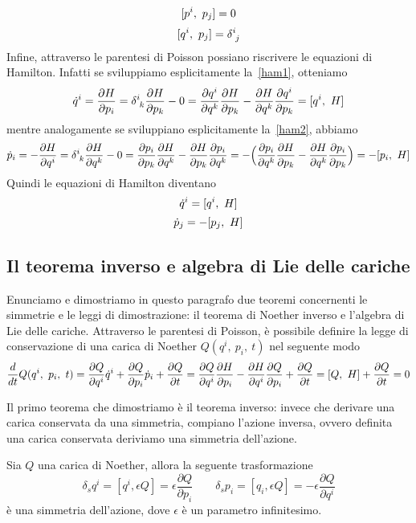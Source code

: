     \begin{equation} \label{canp}
        [p^i, ~p_j] = 0
    \end{equation}
    \begin{equation} \label{canqq}
        \poi{q^i}{p_j} = \delta^i_{\phantom i j}
    \end{equation}
    Infine, attraverso le parentesi di Poisson possiano riscrivere le equazioni di Hamilton. Infatti se sviluppiamo esplicitamente la~\eqref{ham1}, otteniamo 
    \begin{equation*}
        \dot q^i = \pdv{H}{p_i} = \delta^i_{\phantom i k} \pdv{H}{p_k} - 0 = \pdv{q^i}{q^k} \pdv{H}{p_k} - \pdv{H}{q^k} \pdv{q^i}{p_k} = \poi{q^i}{H}
    \end{equation*}
    mentre analogamente se sviluppiano esplicitamente la~\eqref{ham2}, abbiamo
    \begin{equation*}
        \dot p_i = - \pdv{H}{q^i} = \delta^i_{\phantom i k} \pdv{H}{q^k} - 0 = \pdv{p_i}{p_k} \pdv{H}{q^k} - \pdv{H}{p_k} \pdv{p_i}{q^k} = - \Big( \pdv{p_i}{q^k} \pdv{H}{p_k} - \pdv{H}{q^k} \pdv{p_i}{p_k} \Big) = - \poi{p_i}{H}
    \end{equation*}
    Quindi le equazioni di Hamilton diventano 
    \begin{equation} \label{poiham1}
        \dot q^i = [q^i, ~H]
    \end{equation}
    \begin{equation} \label{poiham2}
        \dot p_j = - [p_j, ~H]
    \end{equation}  

\subsection{Il teorema inverso e algebra di Lie delle cariche}

    Enunciamo e dimostriamo in questo paragrafo due teoremi concernenti le simmetrie e le leggi di dimostrazione: il teorema di Noether inverso e l'algebra di Lie delle cariche. Attraverso le parentesi di Poisson, è possibile definire la legge di conservazione di una carica di Noether $ Q(q^i, ~p_i, ~t)$ nel seguente modo
    \begin{equation} \label{caricaham}
        \frac{d}{dt} Q(q^i, ~p_i, ~t) = \frac{\partial Q}{\partial q^i} \dot q^i + \frac{\partial Q}{\partial p_i} \dot p_i + \frac{\partial Q}{\partial t} = \frac{\partial Q}{\partial q^i} \frac{\partial H}{\partial p_i} - \frac{\partial H}{\partial q^i} \frac{\partial Q}{\partial p_i} + \frac{\partial Q}{\partial t} = [Q, ~H] + \frac{\partial Q}{\partial t} = 0
    \end{equation}

    Il primo teorema che dimostriamo è il teorema inverso: invece che derivare una carica conservata da una simmetria, compiano l'azione inversa, ovvero definita una carica conservata deriviamo una simmetria dell'azione.
    \begin{theorem}
        Sia $Q$ una carica di Noether, allora la seguente trasformazione 
    \begin{equation*}
        \delta_s q^i = [q^i, \epsilon Q] = \epsilon \frac{\partial Q}{\partial p_i} \qquad \delta_s p_i = [q_i, \epsilon Q] = - \epsilon \frac{\partial Q}{\partial q^i}
    \end{equation*}
        è una simmetria dell'azione, dove $\epsilon$ è un parametro infinitesimo.
    \end{theorem}

